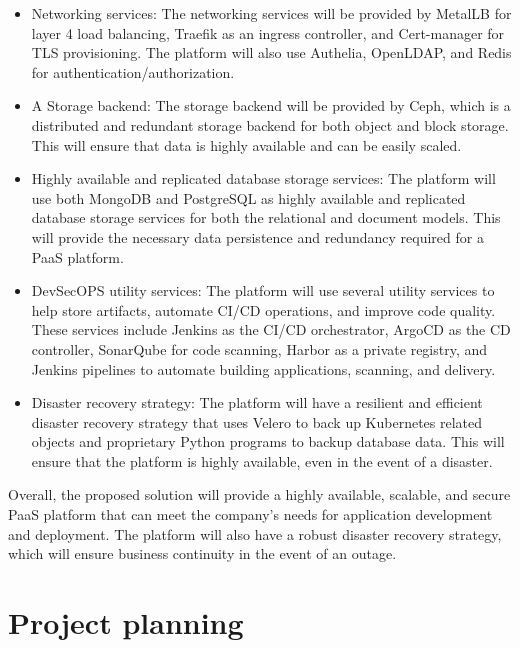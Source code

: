 \begin{itemize}[label={--}]

\item Networking services: The networking services will be provided by MetalLB for layer 4 load balancing, Traefik as an ingress controller, and Cert-manager for TLS provisioning. The platform will also use Authelia, OpenLDAP, and Redis for authentication/authorization. 

\item A Storage backend: The storage backend will be provided by Ceph, which is a distributed and redundant storage backend for both object and block storage. This will ensure that data is highly available and can be easily scaled. 

\item Highly available and replicated database storage services: The platform will use both MongoDB and PostgreSQL as highly available and replicated database storage services for both the relational and document models. This will provide the necessary data persistence and redundancy required for a PaaS platform. 

\item DevSecOPS utility services: The platform will use several utility services to help store artifacts, automate CI/CD operations, and improve code quality. These services include Jenkins as the CI/CD orchestrator, ArgoCD as the CD controller, SonarQube for code scanning, Harbor as a private registry, and Jenkins pipelines to automate building applications, scanning, and delivery. 

\item Disaster recovery strategy: The platform will have a resilient and efficient disaster recovery strategy that uses Velero to back up Kubernetes related objects and proprietary Python programs to backup database data. This will ensure that the platform is highly available, even in the event of a disaster. 

\end{itemize}

Overall, the proposed solution will provide a highly available, scalable, and secure PaaS platform that can meet the company's needs for application development and deployment. The platform will also have a robust disaster recovery strategy, which will ensure business continuity in the event of an outage.  


\newpage  %
\section{Project planning}
